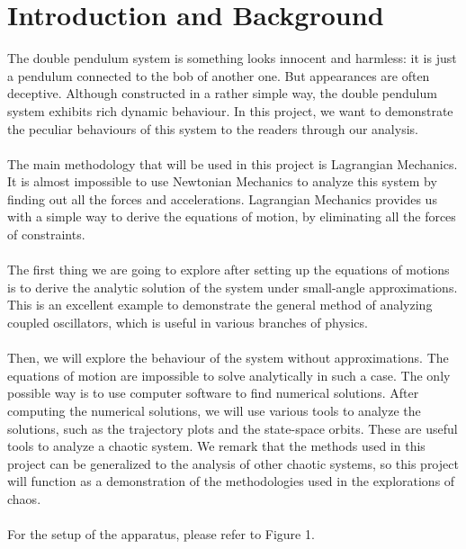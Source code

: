 \documentclass[11pt]{article}
\begin{document}
\section{Introduction and Background}
The double pendulum system is something looks innocent and harmless: it is just a
pendulum connected to the bob of another one. But appearances are often deceptive.
Although constructed in a rather simple way, the double pendulum system exhibits
rich dynamic behaviour. In this project, we want to demonstrate the peculiar
behaviours of this system to the readers through our analysis. \\
\\
The main methodology that will be used in this project is Lagrangian Mechanics. It
is almost impossible to use Newtonian Mechanics to analyze this system by finding
out all the forces and accelerations. Lagrangian Mechanics provides us with a
simple way to derive the equations of motion, by eliminating all the forces of
constraints\cite{Taylor}.\\
\\
The first thing we are going to explore after setting up the equations of motions
is to derive the analytic solution of the system under small-angle approximations.
This is an excellent example to demonstrate the general method of analyzing
coupled oscillators, which is useful in various branches of physics\cite{Landau}.
\\
\\
Then, we will explore the behaviour of the system without approximations. The
equations of motion are impossible to solve analytically in such a
case\cite{Taylor}. The only possible way is to use computer software to find
numerical solutions. After computing the numerical solutions, we will use various
tools to analyze the solutions, such as the trajectory plots and the state-space orbits.
These are useful tools to analyze a chaotic system.
We remark that the methods used in this project
can be generalized to the analysis of other chaotic systems, so this project will
function as a demonstration of the methodologies used in the explorations of
chaos\cite{Taylor}. \\
\\
For the setup of the apparatus, please refer to Figure 1.

\pagebreak
\end{document}
